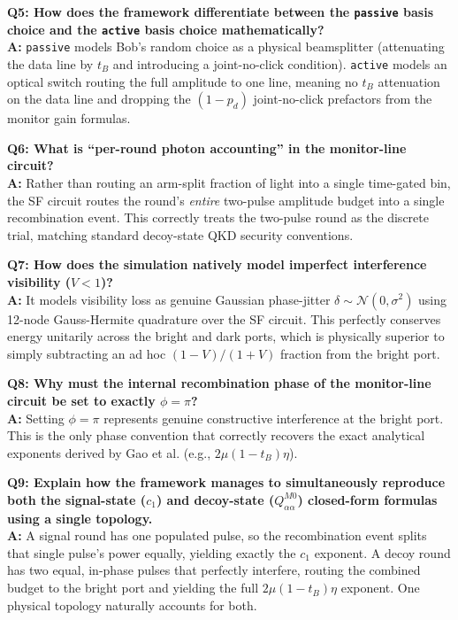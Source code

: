 \documentclass[11pt, a4paper]{article}
\begin{document}
\textbf{Q5: How does the framework differentiate between the \texttt{passive} basis choice and the \texttt{active} basis choice mathematically?} \\
\textbf{A:} \texttt{passive} models Bob's random choice as a physical beamsplitter (attenuating the data line by $t_B$ and introducing a joint-no-click condition). \texttt{active} models an optical switch routing the full amplitude to one line, meaning no $t_B$ attenuation on the data line and dropping the $(1-p_d)$ joint-no-click prefactors from the monitor gain formulas.

\textbf{Q6: What is ``per-round photon accounting'' in the monitor-line circuit?} \\
\textbf{A:} Rather than routing an arm-split fraction of light into a single time-gated bin, the SF circuit routes the round's \textit{entire} two-pulse amplitude budget into a single recombination event. This correctly treats the two-pulse round as the discrete trial, matching standard decoy-state QKD security conventions.

\textbf{Q7: How does the simulation natively model imperfect interference visibility ($V < 1$)?} \\
\textbf{A:} It models visibility loss as genuine Gaussian phase-jitter $\delta \sim \mathcal{N}(0, \sigma^2)$ using 12-node Gauss-Hermite quadrature over the SF circuit. This perfectly conserves energy unitarily across the bright and dark ports, which is physically superior to simply subtracting an ad hoc $(1-V)/(1+V)$ fraction from the bright port.

\textbf{Q8: Why must the internal recombination phase of the monitor-line circuit be set to exactly $\phi=\pi$?} \\
\textbf{A:} Setting $\phi=\pi$ represents genuine constructive interference at the bright port. This is the only phase convention that correctly recovers the exact analytical exponents derived by Gao et al. (e.g., $2\mu(1-t_B)\eta$).

\textbf{Q9: Explain how the framework manages to simultaneously reproduce both the signal-state ($c_1$) and decoy-state ($Q^{M0}_{\alpha\alpha}$) closed-form formulas using a single topology.} \\
\textbf{A:} A signal round has one populated pulse, so the recombination event splits that single pulse's power equally, yielding exactly the $c_1$ exponent. A decoy round has two equal, in-phase pulses that perfectly interfere, routing the combined budget to the bright port and yielding the full $2\mu(1-t_B)\eta$ exponent. One physical topology naturally accounts for both.
\end{document}
